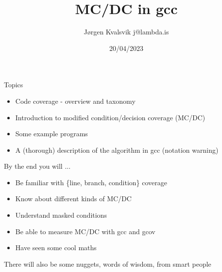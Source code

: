 \documentclass[xcolor = {dvipsnames, table}, aspectratio=169]{beamer}
\title{MC/DC in gcc}
\author{Jørgen Kvalsvik j@lambda.is}
\date{20/04/2023}
\begin{document}
{
    \begin{frame}[plain] \end{frame}
}

\begin{frame}
    \begin{block}{Topics}
        \begin{itemize}
            \item Code coverage - overview and taxonomy
            \item Introduction to modified condition/decision coverage (MC/DC)
            \item Some example programs
            \item A (thorough) description of the algorithm in gcc (notation warning)
        \end{itemize}
    \end{block}
\end{frame}

\begin{frame}
    \begin{block}{By the end you will ...}
        \begin{itemize}
            \item Be familiar with \{line, branch, condition\} coverage
            \item Know about different kinds of MC/DC
            \item Understand masked conditions
            \item Be able to measure MC/DC with gcc and gcov
            \item Have seen some cool maths
        \end{itemize}
    \end{block}

    There will also be some nuggets, words of wisdom, from smart people
\end{frame}
\end{document}
